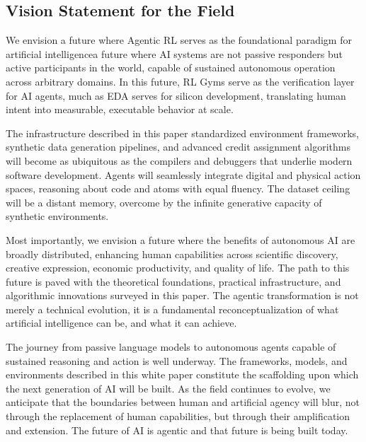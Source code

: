 \subsection{Vision Statement for the Field}

We envision a future where Agentic RL serves as the foundational paradigm for artificial intelligencea future where AI systems are not passive responders but active participants in the world, capable of sustained autonomous operation across arbitrary domains. In this future, RL Gyms serve as the verification layer for AI agents, much as EDA serves for silicon development, translating human intent into measurable, executable behavior at scale.

The infrastructure described in this paper standardized environment frameworks, synthetic data generation pipelines, and advanced credit assignment algorithms will become as ubiquitous as the compilers and debuggers that underlie modern software development. Agents will seamlessly integrate digital and physical action spaces, reasoning about code and atoms with equal fluency. The dataset ceiling will be a distant memory, overcome by the infinite generative capacity of synthetic environments.

Most importantly, we envision a future where the benefits of autonomous AI are broadly distributed, enhancing human capabilities across scientific discovery, creative expression, economic productivity, and quality of life. The path to this future is paved with the theoretical foundations, practical infrastructure, and algorithmic innovations surveyed in this paper. The agentic transformation is not merely a technical evolution, it is a fundamental reconceptualization of what artificial intelligence can be, and what it can achieve.

The journey from passive language models to autonomous agents capable of sustained reasoning and action is well underway. The frameworks, models, and environments described in this white paper constitute the scaffolding upon which the next generation of AI will be built. As the field continues to evolve, we anticipate that the boundaries between human and artificial agency will blur, not through the replacement of human capabilities, but through their amplification and extension. The future of AI is agentic and that future is being built today.
